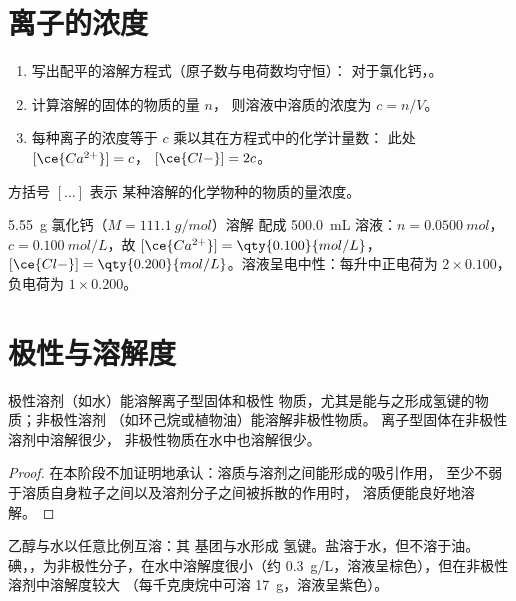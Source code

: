 \section{离子的浓度}

\begin{method}[每种离子的浓度]\label{met:g11:dissolution:ions}
\begin{enumerate}
  \item 写出配平的溶解方程式（原子数与电荷数均守恒）：
        对于氯化钙，。
  \item 计算溶解的固体的物质的量 $n$，
        则溶液中溶质的浓度为 $c = n / V$。
  \item 每种离子的浓度等于 $c$ 乘以其在方程式中的化学计量数：
        此处 $[\ce{Ca^{2+}}] = c$，
        $[\ce{Cl-}] = 2c$。
\end{enumerate}
方括号 $[\ldots]$ 表示
某种溶解的化学物种的物质的量浓度。
\end{method}

\begin{example}[氯化钙]\label{ex:g11:dissolution:cacl2}
\qty{5.55}{g} 氯化钙（$M = \qty{111.1}{g/mol}$）溶解
配成 \qty{500.0}{mL} 溶液：$n = \qty{0.0500}{mol}$，
$c = \qty{0.100}{mol/L}$，故 $[\ce{Ca^{2+}}] = \qty{0.100}{mol/L}$，
$[\ce{Cl-}] = \qty{0.200}{mol/L}$。溶液呈电中性：每升中正电荷为 $2 \times
0.100$，负电荷为 $1 \times 0.200$。
\end{example}

\section{极性与溶解度}

\begin{proposition}[相似相溶]\label{prop:g11:dissolution:like}
极性溶剂（如水）能溶解离子型固体和极性
物质，尤其是能与之形成氢键的物质；非极性溶剂
（如环己烷或植物油）能溶解非极性物质。
离子型固体在非极性溶剂中溶解很少，
非极性物质在水中也溶解很少。
\end{proposition}

\begin{proof}
在本阶段不加证明地承认：溶质与溶剂之间能形成的吸引作用，
至少不弱于溶质自身粒子之间以及溶剂分子之间被拆散的作用时，
溶质便能良好地溶解。
\end{proof}

\begin{example}[三种情形]\label{ex:g11:dissolution:cases}
乙醇与水以任意比例互溶：其  基团与水形成
氢键。盐溶于水，但不溶于油。
碘，，为非极性分子，在水中溶解度很小（约
\qty{0.3}{g/L}，溶液呈棕色），但在非极性溶剂中溶解度较大
（每千克庚烷中可溶 \qty{17}{g}，溶液呈紫色）。
\end{example}

